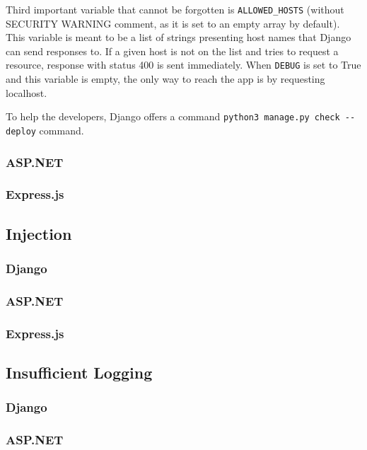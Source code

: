 Third important variable that cannot be forgotten is \lstinline{ALLOWED_HOSTS} (without SECURITY WARNING comment, as it is set to an empty array by default). This variable is meant to be a list of strings presenting host names that Django can send responses to. If a given host is not on the list and tries to request a resource, response with status 400 is sent immediately. When \lstinline{DEBUG} is set to True and this variable is empty, the only way to reach the app is by requesting localhost.

To help the developers, Django offers a command \lstinline{python3 manage.py check --deploy} command.

\subsubsection{ASP.NET}
\subsubsection{Express.js}
\subsection{Injection}
\subsubsection{Django}
\subsubsection{ASP.NET}
\subsubsection{Express.js}
\subsection{Insufficient Logging}
\subsubsection{Django}
\subsubsection{ASP.NET}

